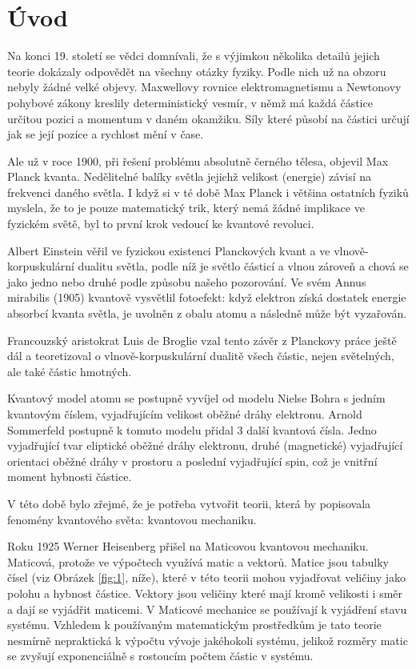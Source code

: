 \section{Úvod}
Na konci 19. století se vědci domnívali, že s výjimkou několika detailů jejich teorie dokázaly odpovědět na všechny otázky fyziky. Podle nich už na obzoru nebyly žádné velké objevy. Maxwellovy rovnice elektromagnetismu a Newtonovy pohybové zákony kreslily deterministický vesmír, v němž má každá částice určitou pozici a momentum v daném okamžiku. Síly které působí na částici určují jak se její pozice a rychlost mění v čase.

Ale už v roce 1900, při řešení problému absolutně černého tělesa, objevil Max Planck kvanta. Nedělitelné balíky světla jejichž velikost (energie) závisí na frekvenci daného světla. I když si v té době Max Planck i většina ostatních fyziků myslela, že to je pouze matematický trik, který nemá žádné implikace ve fyzickém světě, byl to první krok vedoucí ke kvantové revoluci.

Albert Einstein věřil ve fyzickou existenci Planckových kvant a ve vlnově-korpuskulární dualitu světla, podle níž je světlo částicí a vlnou zároveň a chová se jako jedno nebo druhé podle způsobu našeho pozorování. Ve svém Annus mirabilis (1905) kvantově vysvětlil fotoefekt: když elektron získá dostatek energie absorbcí kvanta světla, je uvolněn z obalu atomu a následně může být vyzařován.

Francouzský aristokrat Luis de Broglie vzal tento závěr z Planckovy práce ještě dál a teoretizoval o vlnově-korpuskulární dualitě všech částic, nejen světelných, ale také částic hmotných.

Kvantový model atomu se postupně vyvíjel od modelu Nielse Bohra s jedním kvantovým číslem, vyjadřujícím velikost oběžné dráhy elektronu. Arnold Sommerfeld postupně k tomuto modelu přidal 3 další kvantová čísla. Jedno vyjadřující tvar eliptické oběžné dráhy elektronu, druhé (magnetické) vyjadřující orientaci oběžné dráhy v prostoru a poslední vyjadřující spin, což je vnitřní moment hybnosti částice.

V této době bylo zřejmé, že je potřeba vytvořit teorii, která by popisovala fenomény kvantového světa: kvantovou mechaniku.

Roku 1925 Werner Heisenberg přišel na Maticovou kvantovou mechaniku. Maticová, protože ve výpočtech využívá matic a vektorů. Matice jsou tabulky čísel (viz Obrázek \ref{fig:1}, níže), které v této teorii mohou vyjadřovat veličiny jako polohu a hybnost částice. Vektory jsou veličiny které mají kromě velikosti i směr a dají se vyjádřit maticemi. V Maticové mechanice se používají k vyjádření stavu systému. Vzhledem k používaným matematickým prostředkům je tato teorie nesmírně nepraktická k výpočtu vývoje jakéhokoli systému, jelikož rozměry matic se zvyšují exponenciálně s rostoucím počtem částic v systému.

